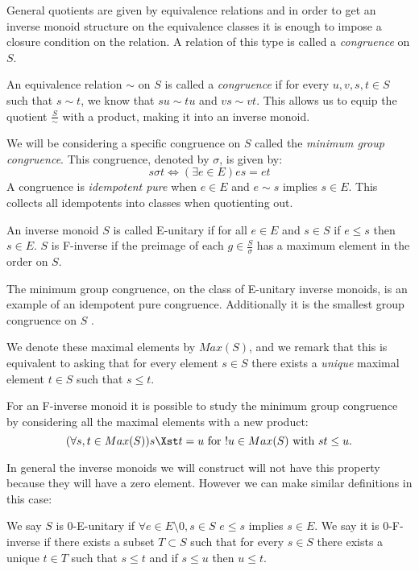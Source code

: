 General quotients are given by equivalence relations and in order to get an inverse monoid structure on the equivalence classes it is enough to impose a closure condition on the relation. A relation of this type is called a \textit{congruence} on $S$.

\begin{definition}
An equivalence relation $\sim$ on $S$ is called a \textit{congruence} if for every $u,v,s,t \in S$ such that $s \sim t$, we know that $su\sim tu$ and $vs \sim vt$. This allows us to equip the quotient $\frac{S}{\sim}$ with a product, making it into an inverse monoid.
\end{definition}

We will be considering a specific congruence on $S$ called the \textit{minimum group congruence}.  This congruence, denoted by $\sigma$, is given by:
\begin{equation*}
s \sigma t \Leftrightarrow (\exists e \in E) es = et
\end{equation*}
A congruence is \textit{idempotent pure} when $e\in E$ and $e \sim s$ implies $s \in E$. This collects all idempotents into classes when quotienting out. 
\begin{definition}
An inverse monoid $S$ is called E-unitary if for all $e \in E$ and $s \in S$ if $e \leq s$ then $s \in E$. $S$ is F-inverse if the preimage of each $g \in \frac{S}{\sigma}$ has a maximum element in the order on $S$.
\end{definition}
The minimum group congruence, on the class of E-unitary inverse monoids, is an example of an idempotent pure congruence. Additionally it is the smallest group congruence on $S$ \cite{MR1694900}.

We denote these maximal elements by $Max(S)$, and we remark that this is equivalent to asking that for every element $s \in S$ there exists a \textit{unique} maximal element $t \in S$ such that $s \leq t$.

For an F-inverse monoid it is possible to study the minimum group congruence by considering all the maximal elements with a new product:
\begin{equation*}
(\forall s,t \in Max(S)) s \Xst t = u \mbox{ for } !u \in Max(S) \mbox{ with } st \leq u.
\end{equation*}

In general the inverse monoids we will construct will not have this property because they will have a zero element. However we can make similar definitions in this case:

\begin{definition}
We say $S$ is 0-E-unitary if $\forall e \in E\setminus 0, s \in S$ $e \leq s$ implies $s \in E$. We say it is 0-F-inverse if there exists a subset $T \subset S$ such that for every $s \in S$ there exists a unique $t \in T$ such that $s \leq t$ and if $s \leq u$ then $u \leq t$.
\end{definition}

